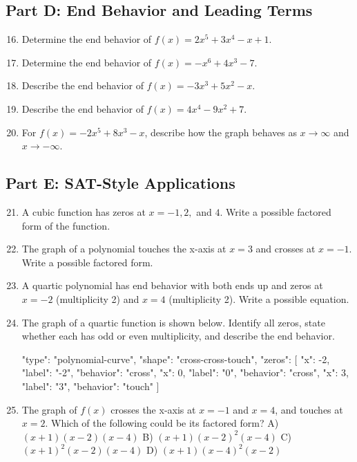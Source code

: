 \documentclass[14pt]{extarticle}
\begin{document}
\subsection*{Part D: End Behavior and Leading Terms}
\begin{enumerate}
  \setcounter{enumi}{15}
  \item Determine the end behavior of \(f(x) = 2x^5 + 3x^4 - x + 1.\)
  \item Determine the end behavior of \(f(x) = -x^6 + 4x^3 - 7.\)
  \item Describe the end behavior of \(f(x) = -3x^3 + 5x^2 - x.\)
  \item Describe the end behavior of \(f(x) = 4x^4 - 9x^2 + 7.\)
  \item For \(f(x) = -2x^5 + 8x^3 - x\), describe how the graph behaves as \(x \to \infty\) and \(x \to -\infty.\)
\end{enumerate}

\subsection*{Part E: SAT-Style Applications}
\begin{enumerate}
  \setcounter{enumi}{20}
  \item A cubic function has zeros at \(x = -1, 2,\) and \(4.\) Write a possible factored form of the function.
  \item The graph of a polynomial touches the x-axis at \(x = 3\) and crosses at \(x = -1.\) Write a possible factored form.
  \item A quartic polynomial has end behavior with both ends up and zeros at \(x = -2\) (multiplicity 2) and \(x = 4\) (multiplicity 2). Write a possible equation.
  \item The graph of a quartic function is shown below. Identify all zeros, state whether each has odd or even multiplicity, and describe the end behavior.
  \begin{diagramdata}
  {
    "type": "polynomial-curve",
    "shape": "cross-cross-touch",
    "zeros": [
      {"x": -2, "label": "-2", "behavior": "cross"},
      {"x": 0, "label": "0", "behavior": "cross"},
      {"x": 3, "label": "3", "behavior": "touch"}
    ]
  }
  \end{diagramdata}
  \item The graph of \(f(x)\) crosses the x-axis at \(x = -1\) and \(x = 4\), and touches at \(x = 2.\) Which of the following could be its factored form?  
  A) \((x + 1)(x - 2)(x - 4)\)  
  B) \((x + 1)(x - 2)^2(x - 4)\)  
  C) \((x + 1)^2(x - 2)(x - 4)\)  
  D) \((x + 1)(x - 4)^2(x - 2)\)
\end{enumerate}
\end{document}
